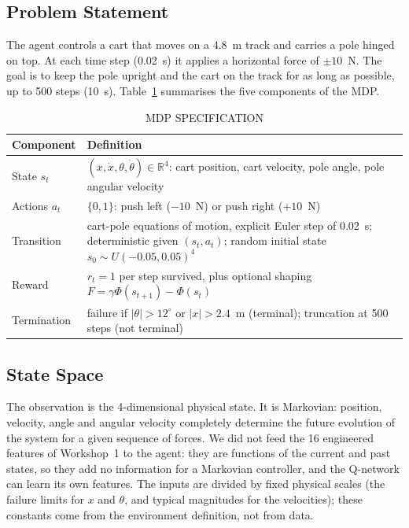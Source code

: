 \documentclass[conference]{IEEEtran}
\begin{document}
\subsection{Problem Statement}
The agent controls a cart that moves on a 4.8~m track and carries a pole hinged on
top. At each time step (0.02~s) it applies a horizontal force of $\pm 10$~N. The goal
is to keep the pole upright and the cart on the track for as long as possible, up to
500 steps (10~s). Table~\ref{tab:mdp} summarises the five components of the MDP.

\begin{table}[t]
\caption{MDP SPECIFICATION}
\label{tab:mdp}
\centering
\small
\begin{tabular}{|p{1.5cm}|p{5.9cm}|}
\hline
\textbf{Component} & \textbf{Definition} \\ \hline
State $s_t$ & $(x, \dot x, \theta, \dot\theta) \in \mathbb{R}^4$: cart position, cart velocity, pole angle, pole angular velocity \\ \hline
Actions $a_t$ & $\{0, 1\}$: push left ($-10$~N) or push right ($+10$~N) \\ \hline
Transition & cart-pole equations of motion, explicit Euler step of 0.02~s; deterministic given $(s_t, a_t)$; random initial state $s_0 \sim U(-0.05, 0.05)^4$ \\ \hline
Reward & $r_t = 1$ per step survived, plus optional shaping $F = \gamma\Phi(s_{t+1}) - \Phi(s_t)$ \\ \hline
Termination & failure if $|\theta| > 12^\circ$ or $|x| > 2.4$~m (terminal); truncation at 500 steps (not terminal) \\ \hline
\end{tabular}
\end{table}

\subsection{State Space}
The observation is the 4-dimensional physical state. It is Markovian: position,
velocity, angle and angular velocity completely determine the future evolution of the
system for a given sequence of forces. We did not feed the 16 engineered features of
Workshop~1 to the agent: they are functions of the current and past states, so they add
no information for a Markovian controller, and the Q-network can learn its own
features. The inputs are divided by fixed physical scales (the failure limits for $x$
and $\theta$, and typical magnitudes for the velocities); these constants come from the
environment definition, not from data.
\end{document}
